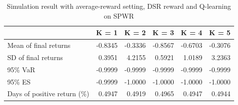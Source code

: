 \documentclass{article}
\begin{document}
\begin{table}[H]
\centering
\begin{tabular}{|l|r|r|r|r|r|} 
\hline
                             & \multicolumn{1}{l|}{K = 1} & \multicolumn{1}{l|}{K = 2} & \multicolumn{1}{l|}{K = 3} & \multicolumn{1}{l|}{K = 4} & \multicolumn{1}{l|}{K = 5}  \\ 
\hline
Mean of final returns        & -0.8345                    & -0.3336                    & -0.8567                    & -0.6703                    & -0.3076                     \\ 
\hline
SD of final returns          & 0.3951                     & 4.2155                     & 0.5921                     & 1.0189                     & 3.2363                      \\ 
\hline
95\% VaR                     & -0.9999                    & -0.9999                    & -0.9999                    & -0.9999                    & -0.9999                     \\ 
\hline
95\% ES                      & -0.9999                    & -1.0000                    & -1.0000                    & -1.0000                    & -1.0000                     \\ 
\hline
Days of positive return (\%) & 0.4947                     & 0.4919                     & 0.4965                     & 0.4947                     & 0.4944                      \\
\hline
\end{tabular}
\caption{Simulation result with average-reward setting, DSR reward and Q-learning on SPWR}
\label{table16}
\end{table}

\end{document}

